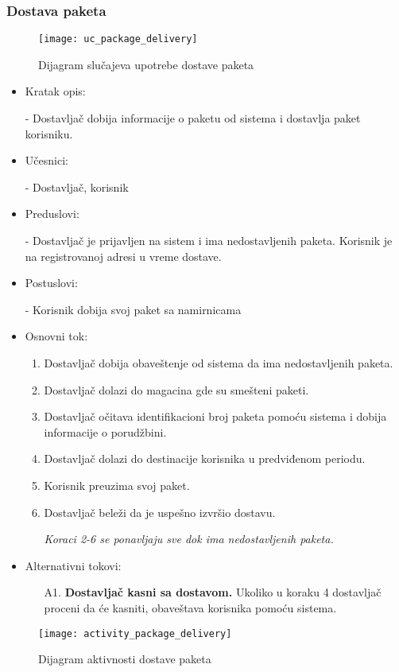 
\subsubsection{Dostava paketa}
\begin{figure}[H]
	\begin{center}
		\texttt{[image: uc\_package\_delivery]}
	\end{center}
	\caption{Dijagram slučajeva upotrebe dostave paketa}
\end{figure}

	\begin{itemize}
		\item{Kratak opis:} 
		
		- Dostavljač dobija informacije o paketu od sistema i dostavlja paket korisniku.
		\item{Učesnici:} 
		
		- Dostavljač, korisnik
		\item{Preduslovi:}
		
		- Dostavljač je prijavljen na sistem i ima nedostavljenih paketa. Korisnik je na registrovanoj adresi u vreme dostave.
		\item{Postuslovi:}
		
		- Korisnik dobija svoj paket sa namirnicama
		\item{Osnovni tok:}
		\begin{enumerate}
			\item{Dostavljač dobija obaveštenje od sistema da ima nedostavljenih paketa.}
			\item{Dostavljač dolazi do magacina gde su smešteni paketi.}
			\item{Dostavljač očitava identifikacioni broj paketa pomoću sistema i dobija informacije o porudžbini.}
			\item{Dostavljač dolazi do destinacije korisnika u predviđenom periodu.}
			\item{Korisnik preuzima svoj paket.}
			\item{Dostavljač beleži da je uspešno izvršio dostavu.}

			\textit{Koraci 2-6 se ponavljaju sve dok ima nedostavljenih paketa.}
		\end{enumerate}
		
		\item{Alternativni tokovi:}
			\begin{enumerate}
				\item[A1.] \textbf{Dostavljač kasni sa dostavom.} Ukoliko u koraku 4 				dostavljač proceni da će kasniti, obaveštava korisnika pomoću sistema.
			\end{enumerate}
	\end{itemize}
	
\begin{figure}[H]
	\begin{center}
		\texttt{[image: activity\_package\_delivery]}
	\end{center}
	\caption{Dijagram aktivnosti dostave paketa}
\end{figure}	
